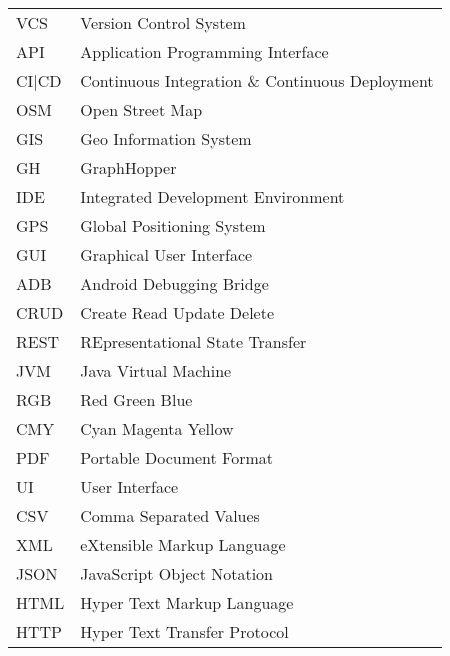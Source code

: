 \begin{singlespace}
\begin{flushleft}
\begin{longtable}{p{2 cm}p{14 cm}}
  VCS & Version Control System \\
  API & Application Programming Interface \\
  CI|CD & Continuous Integration \& Continuous Deployment \\
  OSM & Open Street Map \\
  GIS & Geo Information System \\
  GH & GraphHopper \\
  IDE & Integrated Development Environment \\
  GPS & Global Positioning System \\
  GUI & Graphical User Interface \\	
  ADB & Android Debugging Bridge \\
  CRUD & Create Read Update Delete \\
  REST & REpresentational State Transfer \\
  JVM & Java Virtual Machine \\
  RGB & Red Green Blue \\
  CMY & Cyan Magenta Yellow \\
  PDF & Portable Document Format \\
  UI & User Interface \\
  CSV & Comma Separated Values \\
  XML & eXtensible Markup Language \\
  JSON & JavaScript Object Notation \\
  HTML & Hyper Text Markup Language \\
  HTTP & Hyper Text Transfer Protocol \\
  
\end{longtable}
\end{flushleft}
\end{singlespace}